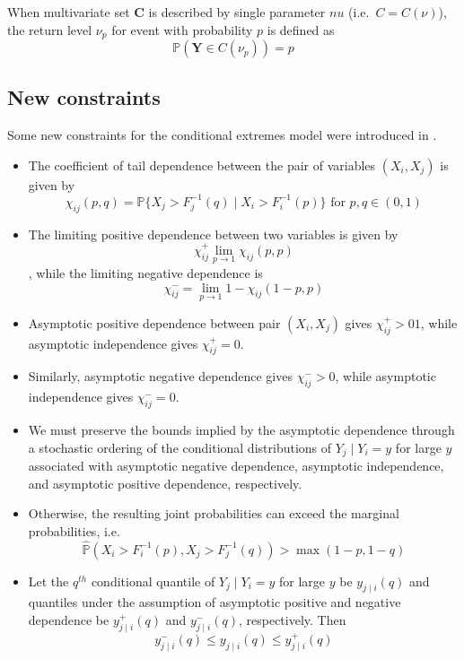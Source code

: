 \documentclass{article}
\begin{document}
When multivariate set $\bm{C}$ is described by single parameter $nu$ (i.e.\ $C = C(\nu)$), the return level $\nu_p$ for event with probability $p$ is defined as 
\[
  \mathbb{P}(\bm{Y} \in C(\nu_p)) = p
\]

\subsection{New constraints}

Some new constraints for the conditional extremes model were introduced in \cite{Keef2013}.

\begin{itemize}
  \item The coefficient of tail dependence between the pair of variables $(X_i, X_j)$ is given by
    \[
      \chi_{ij}(p, q) = \mathbb{P}\{X_j > F_j^{-1}(q) \mid X_i > F_i^{-1}(p)\} \text { for } p, q \in (0, 1)
    \]
  \item The limiting positive dependence between two variables is given by 
    \[
      \chi^+_{ij}\lim_{p \rightarrow 1}{\chi_{ij}(p, p)}
    \],
    while the limiting negative dependence is 
    \[
      \chi^-_{ij} = \lim_{p \rightarrow 1}{1-\chi_{ij}(1 - p, p)}
    \]
  \item Asymptotic positive dependence between pair $(X_i, X_j)$ gives $\chi^+_{ij} >0 1$, while asymptotic independence gives $\chi^+_{ij} = 0$.
  \item Similarly, asymptotic negative dependence gives $\chi^-_{ij} > 0$, while asymptotic independence gives $\chi^-_{ij} = 0$.
  \item We must preserve the bounds implied by the asymptotic dependence through a stochastic ordering of the conditional distributions of $Y_j \mid Y_i = y$ for large $y$ associated with asymptotic negative dependence, asymptotic independence, and asymptotic positive dependence, respectively. 
  \item Otherwise, the resulting joint probabilities can exceed the marginal probabilities, i.e.\
    \[
    \hat{\mathbb{P}}(X_i > F_i^{-1}(p),X_j > F_j^{-1}(q)) > \max(1-p, 1-q)
    \]
  \item Let the $q^{th}$ conditional quantile of $Y_j \mid Y_i = y$ for large $y$ be $y_{j \mid i}(q)$ and quantiles under the assumption of asymptotic positive and negative dependence be $y^+_{j \mid i}(q)$ and $y^-_{j \mid i}(q)$, respectively. 
    Then
    \begin{equation} \label{eq:ordering}
      y^-_{j \mid i}(q) \le y_{j \mid i}(q) \le y^+_{j \mid i}(q)

\end{equation}
\end{itemize}
\end{document}
